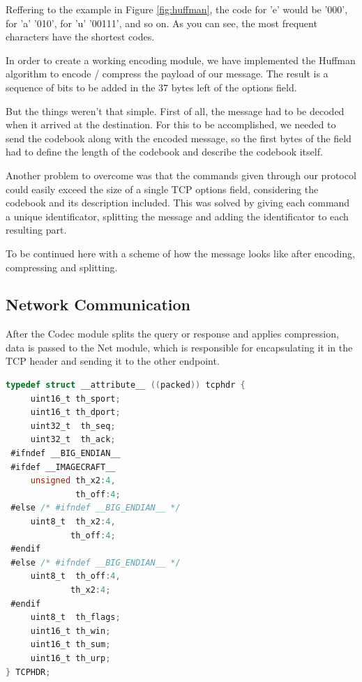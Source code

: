 Reffering to the example in Figure \ref{fig:huffman}, the code for 'e' would
be '000', for 'a' '010', for 'u' '00111', and so on. As you can see, the most
frequent characters have the shortest codes.

In order to create a working encoding module, we have implemented the Huffman
algorithm to encode / compress the payload of our message. The result is a
sequence of bits to be added in the 37 bytes left of the options field.

But the things weren't that simple. First of all, the message had to be decoded
when it arrived at the destination. For this to be accomplished, we needed to
send the codebook along with the encoded message, so the first bytes of the
field had to define the length of the codebook and describe the codebook itself.

Another problem to overcome was that the commands given through our protocol
could easily exceed the size of a single TCP options field, considering the
codebook and its description included. This was solved by giving each command
a unique identificator, splitting the message and adding the identificator to
each resulting part.

To be continued here with a scheme of how the message looks like after encoding,
compressing and splitting.

\subsection{Network Communication}

After the Codec module splits the query or response and applies compression,
data is passed to the Net module, which is responsible for encapsulating it in
the TCP header and sending it to the other endpoint.

\begin{lstlisting}[caption={Default TCP Header Structure},
                   label={lst:def-tcphdr},
                   basicstyle=\footnotesize,
                   captionpos=b,
                   frame=single,
                   language=C
                  ]
typedef struct __attribute__ ((packed)) tcphdr {
     uint16_t th_sport;
     uint16_t th_dport;
     uint32_t  th_seq;
     uint32_t  th_ack;
 #ifndef __BIG_ENDIAN__
 #ifdef __IMAGECRAFT__
     unsigned th_x2:4,
              th_off:4;
 #else /* #ifndef __BIG_ENDIAN__ */
     uint8_t  th_x2:4,
             th_off:4;
 #endif
 #else /* #ifndef __BIG_ENDIAN__ */
     uint8_t  th_off:4,
             th_x2:4;
 #endif
     uint8_t  th_flags;
     uint16_t th_win;
     uint16_t th_sum;
     uint16_t th_urp;
} TCPHDR;
\end{lstlisting}


